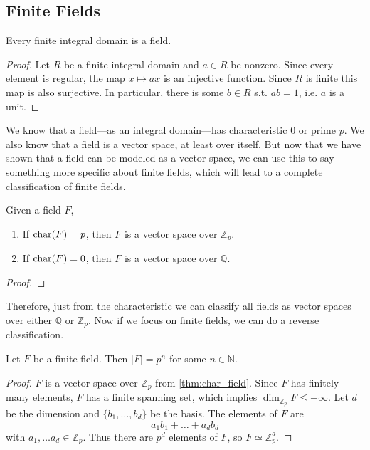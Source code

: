 \subsection{Finite Fields} 

  \begin{theorem}
    Every finite integral domain is a field. 
  \end{theorem} 
  \begin{proof}
    Let $R$ be a finite integral domain and $a \in R$ be nonzero. Since every element is regular, the map $x \mapsto ax$ is an injective function. Since $R$ is finite this map is also surjective. In particular, there is some $b \in R$ s.t. $ab = 1$, i.e. $a$ is a unit. 
  \end{proof}

  We know that a field---as an integral domain---has characteristic $0$ or prime $p$. We also know that a field is a vector space, at least over itself. But now that we have shown that a field can be modeled as a vector space, we can use this to say something more specific about finite fields, which will lead to a complete classification of finite fields. 

  \begin{theorem}
    \label{thm:char_field}
    Given a field $F$, 
    \begin{enumerate}
      \item If $\operatorname{char}(F) = p$, then $F$ is a vector space over $\mathbb{Z}_p$. 
      \item If $\operatorname{char}(F) = 0$, then $F$ is a vector space over $\mathbb{Q}$. 
    \end{enumerate}
  \end{theorem}
  \begin{proof}
    
  \end{proof} 

  Therefore, just from the characteristic we can classify all fields as vector spaces over either $\mathbb{Q}$ or $\mathbb{Z}_p$. Now if we focus on finite fields, we can do a reverse classification. 

  \begin{theorem}
    Let $F$ be a finite field. Then $|F| = p^n$ for some $n \in \mathbb{N}$. 
  \end{theorem}
  \begin{proof}
    $F$ is a vector space over $\mathbb{Z}_p$ from \ref{thm:char_field}. Since $F$ has finitely many elements, $F$ has a finite spanning set, which implies $\dim_{\mathbb{Z}_p} F \leq + \infty$. Let $d$ be the dimension and $\{b_1, \ldots, b_d\}$ be the basis. The elements of $F$ are 
    \begin{equation}
      a_1 b_1 + \ldots + a_d b_d
    \end{equation}
    with $a_1, \ldots a_d \in \mathbb{Z}_p$. Thus there are $p^d$ elements of $F$, so $F \simeq \mathbb{Z}_p^d$. 
  \end{proof}

